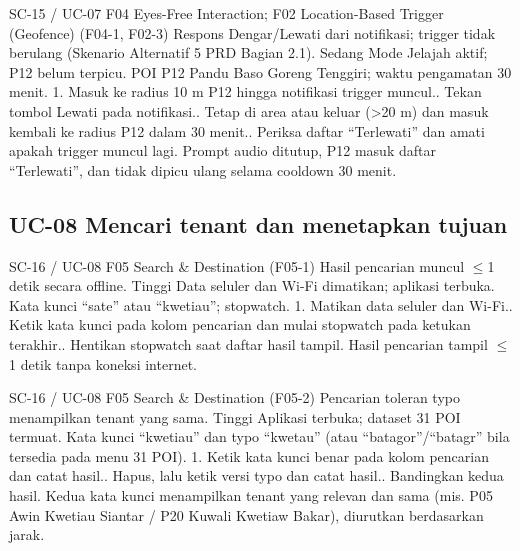 \renewcommand{\tcactual}{Sesuai ekspektasi pada perangkat Android (Aksi Lewati lolos (\texttt{actions.test})). Prompt audio ditutup, P12 masuk daftar ``Terlewati'', dan tidak dipicu ulang selama cooldown 30 menit.}
{SC-15 / UC-07}
{F04 Eyes-Free Interaction; F02 Location-Based Trigger (Geofence)}
{(F04-1, F02-3) Respons Dengar/Lewati dari notifikasi; trigger tidak berulang (Skenario Alternatif 5 PRD Bagian 2.1).}
{Sedang}
{Mode Jelajah aktif; P12 belum terpicu.}
{POI P12 Pandu Baso Goreng Tenggiri; waktu pengamatan 30 menit.}
{1. Masuk ke radius 10 m P12 hingga notifikasi trigger muncul.. Tekan tombol Lewati pada notifikasi.. Tetap di area atau keluar (>20 m) dan masuk kembali ke radius P12 dalam 30 menit.. Periksa daftar ``Terlewati'' dan amati apakah trigger muncul lagi.}
{Prompt audio ditutup, P12 masuk daftar ``Terlewati'', dan tidak dipicu ulang selama cooldown 30 menit.}

\subsection*{UC-08 Mencari tenant dan menetapkan tujuan}

\renewcommand{\tcactual}{Sesuai ekspektasi pada perangkat Android (Lolos via \texttt{04-search} (18/18) \& \texttt{search.test} (10/10)). Hasil pencarian tampil \(\le\)1 detik tanpa koneksi internet.}
{SC-16 / UC-08}
{F05 Search \& Destination}
{(F05-1) Hasil pencarian muncul \(\le\)1 detik secara offline.}
{Tinggi}
{Data seluler dan Wi-Fi dimatikan; aplikasi terbuka.}
{Kata kunci ``sate'' atau ``kwetiau''; stopwatch.}
{1. Matikan data seluler dan Wi-Fi.. Ketik kata kunci pada kolom pencarian dan mulai stopwatch pada ketukan terakhir.. Hentikan stopwatch saat daftar hasil tampil.}
{Hasil pencarian tampil \(\le\)1 detik tanpa koneksi internet.}

\renewcommand{\tcactual}{Sesuai ekspektasi pada perangkat Android (Lolos via \texttt{04-search} (18/18) \& \texttt{search.test} (10/10)). Kedua kata kunci menampilkan tenant yang relevan dan sama (mis. P05 Awin Kwetiau Siantar / P20 Kuwali Kwetiaw Bakar), diurutkan berdasarkan jarak.}
{SC-16 / UC-08}
{F05 Search \& Destination}
{(F05-2) Pencarian toleran typo menampilkan tenant yang sama.}
{Tinggi}
{Aplikasi terbuka; dataset 31 POI termuat.}
{Kata kunci ``kwetiau'' dan typo ``kwetau'' (atau ``batagor''/``batagr'' bila tersedia pada menu 31 POI).}
{1. Ketik kata kunci benar pada kolom pencarian dan catat hasil.. Hapus, lalu ketik versi typo dan catat hasil.. Bandingkan kedua hasil.}
{Kedua kata kunci menampilkan tenant yang relevan dan sama (mis. P05 Awin Kwetiau Siantar / P20 Kuwali Kwetiaw Bakar), diurutkan berdasarkan jarak.}

